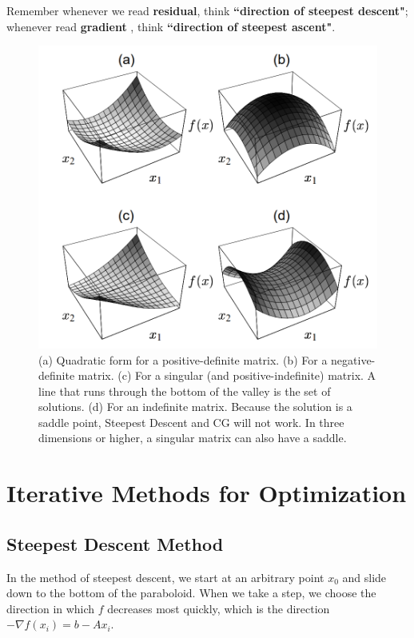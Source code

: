 \documentclass{article}
\begin{document}
Remember whenever we read \textbf{residual}, think \textbf{“direction of steepest descent"}; whenever read \textbf{gradient} , think \textbf{“direction of steepest ascent"}.
\begin{figure}[H]
   \centering
   \includegraphics[scale=0.3]{figure/quadraticform.png}
   \caption{(a) Quadratic form for a positive-definite matrix. (b) For a negative-definite matrix. (c) For a singular (and positive-indefinite) matrix. A line that runs through the bottom of the valley is the set of solutions. (d) For an indefinite matrix. Because the solution is a saddle point, Steepest Descent and CG will not work. In three dimensions or higher, a singular matrix can also have a saddle.}
   \label{fig:quadratic}
\end{figure}


\section{Iterative Methods for Optimization}
\subsection{Steepest Descent Method}
In the method of steepest descent, we start at an arbitrary point $x_0$ and slide down to the bottom of the paraboloid. When we take a step, we choose the direction in which $f$ decreases most quickly, which is the direction $-\nabla f(x_i)= b-Ax_i$. 
\end{document}

